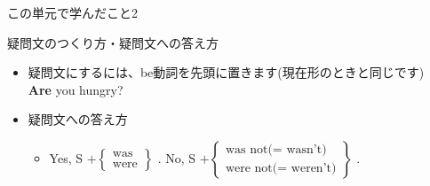 \documentclass[aspectratio=169,xcolor={dvipsnames,table}]{beamer}
\begin{document}
\begin{frame}[plain]{この単元で学んだこと2}

\begin{block}{疑問文のつくり方・疑問文への答え方}
\small
\begin{itemize}[square]
 \item 疑問文にするには、be動詞を先頭に置きます\hfill{\scriptsize (現在形のときと同じです)}\\
\hfill{}{\bfseries Are} you hungry?
 \item 疑問文への答え方
\begin{itemize}[circle]
 \item Yes, S $+ \left\{\begin{array}{l}
		  \text{was}\\
		\text{were}\end{array}\right\}$\,\,.
\hspace{20pt}
No, S $+ \left\{\begin{array}{l}
		  \text{was not($=$ wasn't)}\\
		\text{were not($=$ weren't)}\end{array}\right\}$\,\,.
\end{itemize}
\end{itemize}
      \end{block}
\end{frame}
\end{document}
